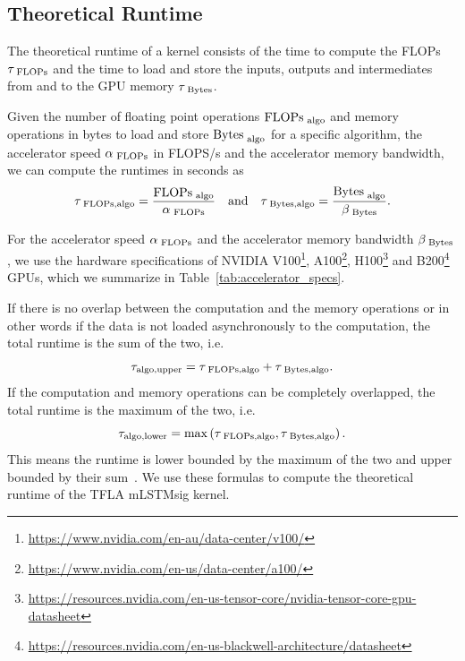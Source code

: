 \documentclass{article}
\begin{document}
    \subsection{Theoretical Runtime}
    \label{app:theoretical_runtime_mlstmsig}

    The theoretical runtime of a kernel consists of the time to compute the FLOPs $\tau_{\text{ FLOPs}{{}}}$ and the time to load and store the inputs, outputs and intermediates from and to the GPU memory $\tau_{\text{ Bytes}{{}}}$.

    Given the number of floating point operations $\text{FLOPs}_\text{ algo}$ and memory operations in bytes to load and store $\text{Bytes}_\text{ algo}$ for a specific algorithm, the accelerator speed $\alpha_{\text{ FLOPs}{{}}}$ in FLOPS/s and the accelerator memory bandwidth, we can compute the runtimes in seconds as
    \begin{equation}
        \tau_{\text{ FLOPs}{{\text{,algo}}}} = \frac{\text{FLOPs}_\text{ algo}}{\alpha_{\text{ FLOPs}{{}}}} \quad \text{and} \quad \tau_{\text{ Bytes}{{\text{,algo}}}} = \frac{\text{Bytes}_\text{ algo}}{\beta_{\text{ Bytes}{{}}}}.
    \end{equation}

    For the accelerator speed $\alpha_{\text{ FLOPs}{{}}}$ and the accelerator memory bandwidth $\beta_{\text{ Bytes}{{}}}$, we use the hardware specifications of NVIDIA V100\footnote{\url{https://www.nvidia.com/en-au/data-center/v100/}}, A100\footnote{\url{https://www.nvidia.com/en-us/data-center/a100/}}, H100\footnote{\url{https://resources.nvidia.com/en-us-tensor-core/nvidia-tensor-core-gpu-datasheet}} and B200\footnote{\url{https://resources.nvidia.com/en-us-blackwell-architecture/datasheet}} GPUs, which we summarize in Table~\ref{tab:accelerator_specs}.

    If there is no overlap between the computation and the memory operations or in other words if the data is not loaded asynchronously to the computation, the total runtime is the sum of the two, i.e.
    \begin{equation}
        \tau_\text{algo,upper} = \tau_{\text{ FLOPs}{{\text{,algo}}}} + \tau_{\text{ Bytes}{{\text{,algo}}}}.
    \end{equation}
    If the computation and memory operations can be completely overlapped, the total runtime is the maximum of the two, i.e.
    \begin{equation}
        \tau_\text{algo,lower} = \max\left(\tau_{\text{ FLOPs}{{\text{,algo}}}}, \tau_{\text{ Bytes}{{\text{,algo}}}}\right).
    \end{equation}
    This means the runtime is lower bounded by the maximum of the two and upper bounded by their sum~\citep[Part 1]{austin:25scaling-book}.
    We use these formulas to compute the theoretical runtime of the TFLA mLSTMsig kernel.
\end{document}
